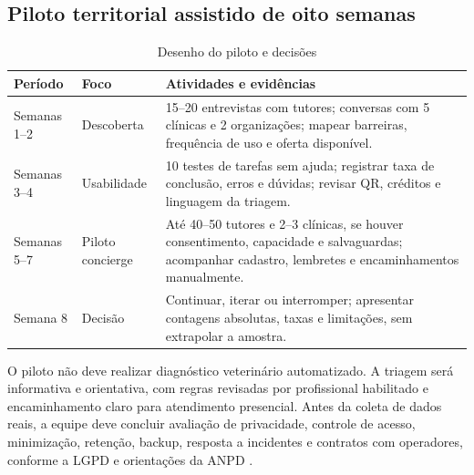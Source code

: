 \subsection{Piloto territorial assistido de oito semanas}
\begin{table}[H]\centering
\caption{Desenho do piloto e decisões}
\begin{tabularx}{\textwidth}{L{2cm}L{2.5cm}Y}
\toprule
Período & Foco & Atividades e evidências\\\midrule
Semanas 1--2 & Descoberta & 15--20 entrevistas com tutores; conversas com 5 clínicas e 2 organizações; mapear barreiras, frequência de uso e oferta disponível.\\
Semanas 3--4 & Usabilidade & 10 testes de tarefas sem ajuda; registrar taxa de conclusão, erros e dúvidas; revisar QR, créditos e linguagem da triagem.\\
Semanas 5--7 & Piloto concierge & Até 40--50 tutores e 2--3 clínicas, se houver consentimento, capacidade e salvaguardas; acompanhar cadastro, lembretes e encaminhamentos manualmente.\\
Semana 8 & Decisão & Continuar, iterar ou interromper; apresentar contagens absolutas, taxas e limitações, sem extrapolar a amostra.\\
\bottomrule
\end{tabularx}\fonteautores
\end{table}

O piloto não deve realizar diagnóstico veterinário automatizado. A triagem será informativa e orientativa, com regras revisadas por profissional habilitado e encaminhamento claro para atendimento presencial. Antes da coleta de dados reais, a equipe deve concluir avaliação de privacidade, controle de acesso, minimização, retenção, backup, resposta a incidentes e contratos com operadores, conforme a LGPD e orientações da ANPD \cite{brasil2018,anpd2021,anpd2022}.